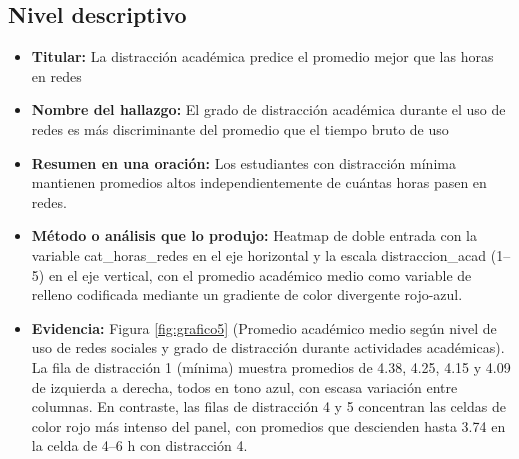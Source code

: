 \documentclass[12pt]{article}
\begin{document}
\subsection*{Nivel descriptivo}
\begin{itemize}
    \item \textbf{Titular:} La distracción académica predice el promedio mejor que las horas en redes 
    \item \textbf{Nombre del hallazgo:} El grado de distracción académica durante el uso de redes es más discriminante del promedio que el tiempo bruto de uso
    \item \textbf{Resumen en una oración: } Los estudiantes con distracción mínima mantienen promedios altos independientemente de cuántas horas pasen en redes.
    \item \textbf{Método o análisis que lo produjo:} Heatmap de doble entrada con la variable cat\_horas\_redes en el eje horizontal y la escala distraccion\_acad (1–5) en el eje vertical, con el promedio académico medio como variable de relleno codificada mediante un gradiente de color divergente rojo-azul.
    \item \textbf{Evidencia:} Figura \ref{fig:grafico5} (Promedio académico medio según nivel de uso de redes sociales y grado de distracción durante actividades académicas). La fila de distracción 1 (mínima) muestra promedios de 4.38, 4.25, 4.15 y 4.09 de izquierda a derecha, todos en tono azul, con escasa variación entre columnas. En contraste, las filas de distracción 4 y 5 concentran las celdas de color rojo más intenso del panel, con promedios que descienden hasta 3.74 en la celda de 4–6 h con distracción 4.
\end{itemize}
\end{document}

